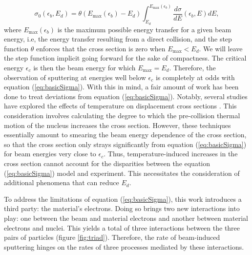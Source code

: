\documentclass{article}
\begin{document}
\begin{equation}
  \sigma_0(\epsilon_b, {E}_d)
  =
  \theta(E_\text{max}(\epsilon_b) - E_d)
  \int_{E_d}^{E_\text{max}(\epsilon_b)}
  \frac{d\sigma}{dE}(\epsilon_b, E)
  dE,
  \label{eq:basicSigma}
\end{equation}
%
where $E_\text{max}(\epsilon_b)$
is the maximum possible energy transfer for a given beam energy, i.e, the
energy transfer resulting from a direct collision, and the step function
$\theta$ enforces that the cross section is zero when $E_\text{max} < E_d$.
We will leave the step function implicit going forward for the sake of
compactness.
The critical energy $\epsilon_c$ is then the beam energy for which
$E_\text{max}=E_d$.
Therefore, the observation of sputtering at energies well below $\epsilon_c$ is
completely at odds with equation (\ref{eq:basicSigma}).
With this in mind, a fair amount of work has been done to treat deviations from
equation (\ref{eq:basicSigma}).
Notably, several studies have explored the effects of temperature on
displacement cross sections 
\cite{Meyer2012,Susi2016,Yoshimura2018}.
This consideration involves calculating the degree to which the pre-collision
thermal motion of the nucleus increases the cross section.
However, these techniques essentially amount to smearing the beam energy
dependence of the cross section, so that the cross section only strays
significantly from equation (\ref{eq:basicSigma}) for beam energies very close
to $\epsilon_c$.
Thus, temperature-induced increases in the cross section cannot account for the
disparities between the equation (\ref{eq:basicSigma}) model and
experiment.
This necessitates the consideration of additional phenomena that can reduce
$E_d$.

To address the limitations of equation (\ref{eq:basicSigma}), this work
introduces a third party: the material's electrons.
Doing so brings two new interactions into play: one between the beam and
material electrons and another between material electrons and nuclei.
This yields a total of three interactions between the three pairs of particles
(figure \ref{fig:triad}).
Therefore, the rate of beam-induced sputtering hinges on the rates of three
processes mediated by these interactions.
\end{document}
